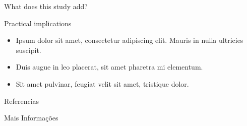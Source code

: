 \documentclass[final]{beamer}
\newlength{\sepwidth}
\newlength{\colwidth}
\newcommand{\separatorcolumn}{\begin{column}{\sepwidth}\end{column}}
\begin{document}
\begin{frame}[t]
\begin{columns}[t]
\begin{column}{\colwidth}
\begin{exampleblock}{What does this study add?}
  \end{exampleblock}


  \begin{exampleblock}{Practical implications}
    \begin{itemize}
      \item Ipsum dolor sit amet, consectetur adipiscing elit. Mauris in nulla ultricies suscipit.
      \item Duis augue in leo placerat, sit amet pharetra mi elementum.
      \item Sit amet pulvinar, feugiat velit sit amet, tristique dolor.
    \end{itemize}

  \end{exampleblock}


  \begin{block}{Referencias}

    \nocite{*}
    \footnotesize{}

  \end{block}

  \begin{block}{Mais Informações}

    

  \end{block}

\end{column}
\separatorcolumn



\end{columns}
\end{frame}
\end{document}
